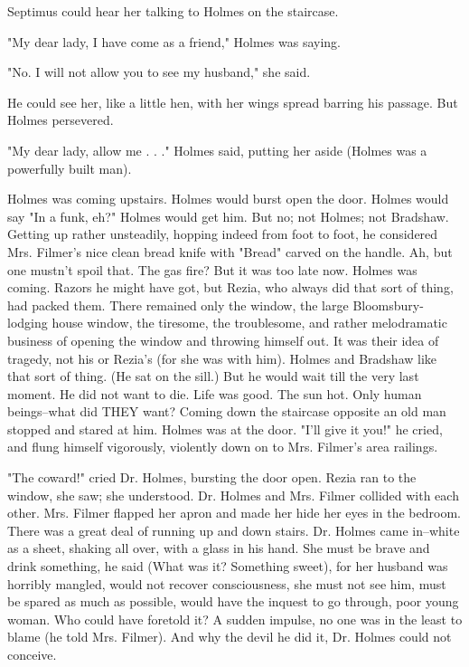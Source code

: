 \documentclass[lang=cn,10pt]{elegantbook}
\begin{document}
Septimus could hear her talking to Holmes on the staircase.

"My dear lady, I have come as a friend," Holmes was saying.

"No.  I will not allow you to see my husband," she said.

He could see her, like a little hen, with her wings spread barring
his passage.  But Holmes persevered.

"My dear lady, allow me . . ." Holmes said, putting her aside
(Holmes was a powerfully built man).

Holmes was coming upstairs.  Holmes would burst open the door.
Holmes would say "In a funk, eh?"  Holmes would get him.  But no;
not Holmes; not Bradshaw.  Getting up rather unsteadily, hopping
indeed from foot to foot, he considered Mrs. Filmer's nice clean
bread knife with "Bread" carved on the handle.  Ah, but one mustn't
spoil that.  The gas fire?  But it was too late now.  Holmes was
coming.  Razors he might have got, but Rezia, who always did that
sort of thing, had packed them.  There remained only the window,
the large Bloomsbury-lodging house window, the tiresome, the
troublesome, and rather melodramatic business of opening the window
and throwing himself out.  It was their idea of tragedy, not his or
Rezia's (for she was with him).  Holmes and Bradshaw like that sort
of thing.  (He sat on the sill.)  But he would wait till the very
last moment.  He did not want to die.  Life was good.  The sun hot.
Only human beings--what did THEY want?  Coming down the staircase
opposite an old man stopped and stared at him.  Holmes was at the
door.  "I'll give it you!" he cried, and flung himself vigorously,
violently down on to Mrs. Filmer's area railings.

"The coward!" cried Dr. Holmes, bursting the door open.  Rezia ran
to the window, she saw; she understood.  Dr. Holmes and Mrs. Filmer
collided with each other.  Mrs. Filmer flapped her apron and made
her hide her eyes in the bedroom.  There was a great deal of
running up and down stairs.  Dr. Holmes came in--white as a sheet,
shaking all over, with a glass in his hand.  She must be brave and
drink something, he said (What was it?  Something sweet), for her
husband was horribly mangled, would not recover consciousness, she
must not see him, must be spared as much as possible, would have
the inquest to go through, poor young woman.  Who could have
foretold it?  A sudden impulse, no one was in the least to blame
(he told Mrs. Filmer).  And why the devil he did it, Dr. Holmes
could not conceive.
\end{document}
